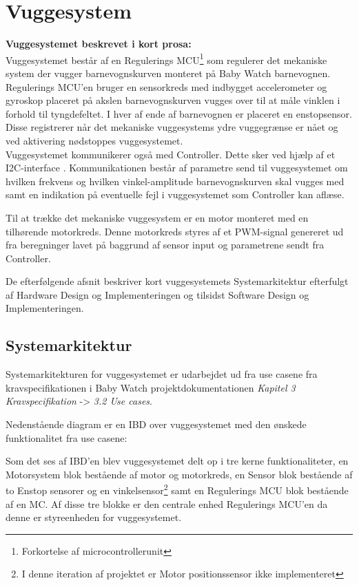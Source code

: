 \chapter{Vuggesystem}
\label{vuggesys}
\textbf{Vuggesystemet beskrevet i kort prosa:} \\
Vuggesystemet består af en Regulerings MCU\footnote{Forkortelse af microcontrollerunit} som regulerer det mekaniske system der vugger barnevognskurven monteret på Baby Watch barnevognen. \\ Regulerings MCU'en bruger en sensorkreds med indbygget accelerometer og gyroskop placeret på akslen barnevognskurven vugges over til at måle vinklen i forhold til tyngdefeltet. I hver af ende af barnevognen er placeret en enstopsensor. Disse registrerer når det mekaniske vuggesystems ydre vuggegrænse er nået og ved aktivering nødstoppes vuggesystemet. \\ Vuggesystemet kommunikerer også med Controller. Dette sker ved hjælp af et I2C-interface \citep{I2C}. Kommunikationen består af parametre send til vuggesystemet om hvilken frekvens og hvilken vinkel-amplitude barnevognskurven skal vugges med samt en indikation på eventuelle fejl i vuggesystemet som Controller kan aflæse.

Til at trække det mekaniske vuggesystem er en motor monteret med en tilhørende motorkreds. Denne motorkreds styres af et PWM-signal genereret ud fra beregninger lavet på baggrund af sensor input og parametrene sendt fra Controller.

De efterfølgende afsnit beskriver kort vuggesystemets Systemarkitektur efterfulgt af Hardware Design og Implementeringen og tilsidst Software Design og Implementeringen.
\newpage
\section{Systemarkitektur}
\label{vs_sysark}
Systemarkitekturen for vuggesystemet er udarbejdet ud fra use casene fra kravspecifikationen i Baby Watch projektdokumentationen \textit{Kapitel 3 Kravspecifikation} -> \textit{3.2 Use cases}.

Nedenstående diagram er en IBD over vuggesystemet med den ønskede funktionalitet fra use casene:


Som det ses af IBD'en blev vuggesystemet delt op i tre kerne funktionaliteter, en Motorsystem blok bestående af motor og motorkreds, en Sensor blok bestående af to Enstop sensorer og en vinkelsensor\footnote{I denne iteration af projektet er Motor positionssensor ikke implementeret} samt en Regulerings MCU blok bestående af en MC. Af disse tre blokke er den centrale enhed Regulerings MCU'en da denne er styreenheden for vuggesystemet.

